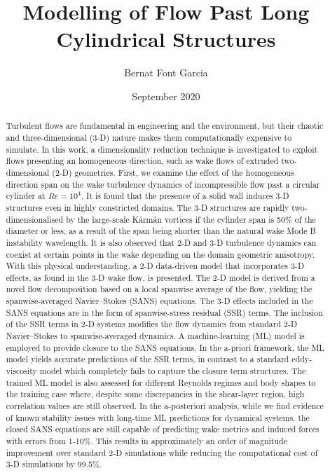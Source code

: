 \documentclass[11pt, a4paper]{etc/feereport}
\begin{document}
\frontmatter

\title{Modelling of Flow Past Long Cylindrical Structures}
\date{September 2020}
\author{Bernat Font Garcia}

\maketitle

\begin{abstract}
Turbulent flows are fundamental in engineering and the environment, but their chaotic and three-dimensional (3-D) nature makes them computationally expensive to simulate.
In this work, a dimensionality reduction technique is investigated to exploit flows presenting an homogeneous direction, such as wake flows of extruded two-dimensional (2-D) geometries.
First, we examine the effect of the homogeneous direction span on the wake turbulence dynamics of incompressible flow past a circular cylinder at $Re=10^4$.
It is found that the presence of a solid wall induces 3-D structures even in highly constricted domains.
The 3-D structures are rapidly two-dimensionalised by the large-scale K\'{a}rm\'{a}n vortices if the cylinder span is 50\% of the diameter or less, as a result of the span being shorter than the natural wake Mode B instability wavelength.
It is also observed that 2-D and 3-D turbulence dynamics can coexist at certain points in the wake depending on the domain geometric anisotropy.
With this physical understanding, a 2-D data-driven model that incorporates 3-D effects, as found in the 3-D wake flow, is presented.
The 2-D model is derived from a novel flow decomposition based on a local spanwise average of the flow, yielding the spanwise-averaged Navier--Stokes (SANS) equations.
The 3-D effects included in the SANS equations are in the form of spanwise-stress residual (SSR) terms.
The inclusion of the SSR terms in 2-D systems modifies the flow dynamics from standard 2-D Navier--Stokes to spanwise-averaged dynamics.
A machine-learning (ML) model is employed to provide closure to the SANS equations.
In the a-priori framework, the ML model yields accurate predictions of the SSR terms, in contrast to a standard eddy-viscosity model which completely fails to capture the closure term structures.
The trained ML model is also assessed for different Reynolds regimes and body shapes to the training case where, despite some discrepancies in the shear-layer region, high correlation values are still observed.
In the a-posteriori analysis, while we find evidence of known stability issues with long-time ML predictions for dynamical systems, the closed SANS equations are still capable of predicting wake metrics and induced forces with errors from 1-10\%.
This results in approximately an order of magnitude improvement over standard 2-D simulations while reducing the computational cost of 3-D simulations by 99.5\%.
\end{abstract}
\end{document}
